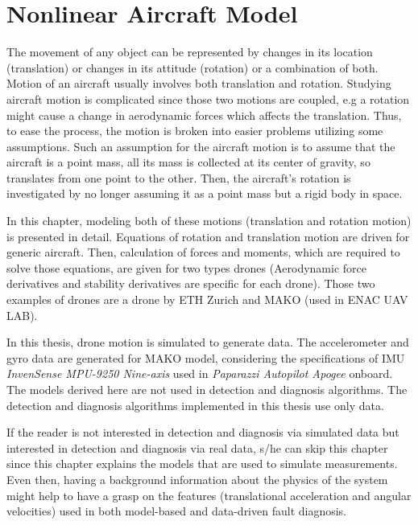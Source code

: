 \chapter{Nonlinear Aircraft Model}

The movement of any object can be represented by changes in its location (translation) or changes in its attitude (rotation) or a combination of both. 
Motion of an aircraft usually involves both translation and rotation. 
Studying aircraft motion is complicated since those two motions are coupled, e.g a rotation might cause a change in aerodynamic forces which affects the translation. 
Thus, to ease the process, the motion is broken into easier problems utilizing some assumptions. 
Such an assumption for the aircraft motion is to assume that the aircraft is a point mass, all its mass is collected at its center of gravity, so translates from one point to the other. 
Then, the aircraft's rotation is investigated by no longer assuming it as a point mass but a rigid body in space. 

In this chapter, modeling both of these motions (translation and rotation motion) is presented in detail.
Equations of rotation and translation motion are driven for generic aircraft. Then, calculation of forces and moments, which are required to solve those equations, are given for two types drones (Aerodynamic force derivatives and stability derivatives are specific for each drone). 
Those two examples of drones are a drone by ETH Zurich and MAKO (used in ENAC UAV LAB).
 
In this thesis, drone motion is simulated to generate data.
The accelerometer and gyro data are generated for MAKO model, considering the specifications of IMU \emph{InvenSense MPU-9250 Nine-axis} used in \emph{Paparazzi Autopilot Apogee} onboard. 
The models derived here are not used in detection and diagnosis algorithms. 
The detection and diagnosis algorithms implemented in this thesis use only data. 

If the reader is not interested in detection and diagnosis via simulated data but interested in detection and diagnosis via real data, s/he can skip this chapter since this chapter explains the models that are used to simulate measurements.
Even then, having a background information about the physics of the system might help to have a grasp on the features (translational acceleration and angular velocities) used in both model-based and data-driven fault diagnosis.


